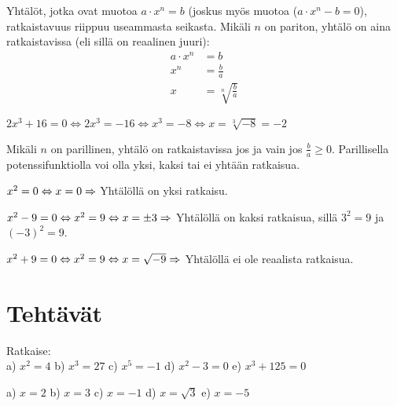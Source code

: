 Yhtälöt, jotka ovat muotoa $a\cdot x^n = b$ (joskus myös muotoa ($a\cdot x^n - b = 0$), ratkaistavuus riippuu useammasta seikasta. Mikäli $n$ on pariton, yhtälö on aina ratkaistavissa (eli sillä on reaalinen juuri):
\begin{align*}
a\cdot x^n &= b \\
x^n &= \frac{b}{a} \\
x &= \sqrt[n]{\frac{b}{a}}
\end{align*}

\begin{esimerkki}
$2x^3 + 16 = 0 \Leftrightarrow 2x^3 = -16 \Leftrightarrow x^3 = -8  \Leftrightarrow x = \sqrt[3]{-8} = -2 $
\end{esimerkki}

Mikäli $n$ on parillinen, yhtälö on ratkaistavissa jos ja vain jos $\frac{b}{a} \geq 0 $. Parillisella potenssifunktiolla voi olla yksi, kaksi tai ei yhtään ratkaisua.

\begin{esimerkki}
$x^2 = 0 \Leftrightarrow x = 0 \\
\Rightarrow$ Yhtälöllä on yksi ratkaisu.
\end{esimerkki}

\begin{esimerkki}
$x^2 - 9 = 0 \Leftrightarrow x^2 = 9 \Leftrightarrow x = \pm 3 \\
\Rightarrow$ Yhtälöllä on kaksi ratkaisua, sillä $3^2 = 9$ ja $(-3)^2 = 9$.
\end{esimerkki}

\begin{esimerkki}
$x^2 + 9 = 0 \Leftrightarrow x^2 = 9 \Leftrightarrow x = \sqrt{-9} \\
\Rightarrow$ Yhtälöllä ei ole reaalista ratkaisua.
\end{esimerkki}

\section*{Tehtävät}

\begin{tehtava}
Ratkaise: \\
a) $ x^2 = 4 $ \qquad
b) $ x^3 = 27 $ \qquad
c) $ x^5 = -1 $ \qquad
d) $ x^2 - 3 = 0 $ \qquad
e) $ x^3 + 125 = 0 $
\begin{vastaus}
a) $ x = 2 $ \qquad
b) $ x = 3 $ \qquad
c) $ x = -1 $ \qquad
d) $ x = \sqrt{3} $ \qquad
e) $ x = -5 $ 
\end{vastaus}
\end{tehtava}

